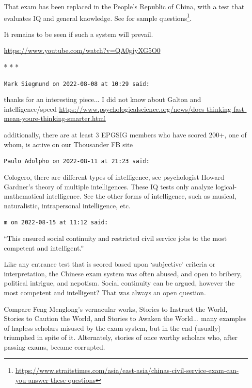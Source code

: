 That exam has been replaced in the People's Republic of China, with a test that evaluates IQ and general knowledge. See for sample questions\footnote{\url{https://www.straitstimes.com/asia/east-asia/chinas-civil-service-exam-can-you-answer-these-questions}}.

It remains to be seen if such a system will prevail.

\url{https://www.youtube.com/watch?v=QA0gjyXG5O0}


\begin{center}* * *\end{center}

\begin{footnotesize}
\begin{sffamily}
\texttt{Mark Siegmund on 2022-08-08 at 10:29 said:}

thanks for an interesting piece... I did not know about Galton and intelligence/speed
\url{https://www.psychologicalscience.org/news/does-thinking-fast-mean-youre-thinking-smarter.html}

additionally, there are at least 3 EPGSIG members who have scored 200+, one of whom, is active on our Thousander FB site

\hfill

\texttt{Paulo Adolpho on 2022-08-11 at 21:23 said:}

Cologero, there are different types of intelligence, see psychologist Howard Gardner's theory of multiple intelligences. These IQ tests only analyze logical-mathematical intelligence. See the other forms of intelligence, such as musical, naturalistic, intrapersonal intelligence, etc.

\hfill

\texttt{m on 2022-08-15 at 11:12 said:}

``This ensured social continuity and restricted civil service jobs to the most competent and intelligent.''

Like any entrance test that is scored based upon `subjective' criteria or interpretation, the Chinese exam system was often abused, and open to bribery, political intrigue, and nepotism. Social continuity can be argued, however the most competent and intelligent? That was always an open question.

Compare Feng Menglong's vernacular works, Stories to Instruct the World, Stories to Caution the World, and Stories to Awaken the World... many examples of hapless scholars misused by the exam system, but in the end (usually) triumphed in spite of it. Alternately, stories of once worthy scholars who, after passing exams, became corrupted.


\end{sffamily}
\end{footnotesize}
